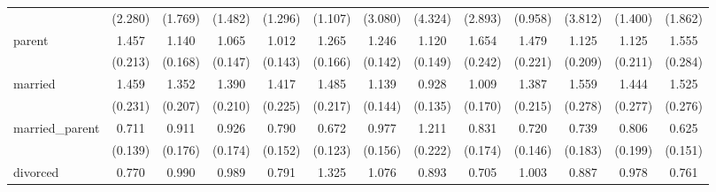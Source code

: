 {\begin{tabular}{l*{12}{c}}
                    &     (2.280)         &     (1.769)         &     (1.482)         &     (1.296)         &     (1.107)         &     (3.080)         &     (4.324)         &     (2.893)         &     (0.958)         &     (3.812)         &     (1.400)         &     (1.862)         \\
[1em]
parent              &       1.457\sym{**} &       1.140         &       1.065         &       1.012         &       1.265         &       1.246         &       1.120         &       1.654\sym{***}&       1.479\sym{**} &       1.125         &       1.125         &       1.555\sym{*}  \\
                    &     (0.213)         &     (0.168)         &     (0.147)         &     (0.143)         &     (0.166)         &     (0.142)         &     (0.149)         &     (0.242)         &     (0.221)         &     (0.209)         &     (0.211)         &     (0.284)         \\
[1em]
married             &       1.459\sym{*}  &       1.352\sym{*}  &       1.390\sym{*}  &       1.417\sym{*}  &       1.485\sym{**} &       1.139         &       0.928         &       1.009         &       1.387\sym{*}  &       1.559\sym{*}  &       1.444         &       1.525\sym{*}  \\
                    &     (0.231)         &     (0.207)         &     (0.210)         &     (0.225)         &     (0.217)         &     (0.144)         &     (0.135)         &     (0.170)         &     (0.215)         &     (0.278)         &     (0.277)         &     (0.276)         \\
[1em]
married\_parent      &       0.711         &       0.911         &       0.926         &       0.790         &       0.672\sym{*}  &       0.977         &       1.211         &       0.831         &       0.720         &       0.739         &       0.806         &       0.625         \\
                    &     (0.139)         &     (0.176)         &     (0.174)         &     (0.152)         &     (0.123)         &     (0.156)         &     (0.222)         &     (0.174)         &     (0.146)         &     (0.183)         &     (0.199)         &     (0.151)         \\
[1em]
divorced            &       0.770         &       0.990         &       0.989         &       0.791         &       1.325         &       1.076         &       0.893         &       0.705         &       1.003         &       0.887         &       0.978         &       0.761         \\

\end{tabular}}

